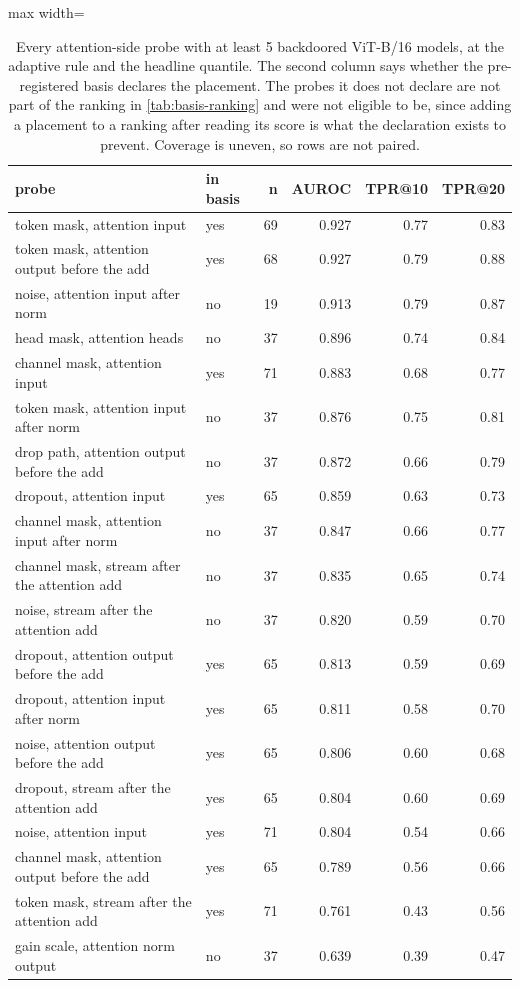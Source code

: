 \begin{table}[htbp]
\centering
\small
\caption{Every attention-side probe with at least 5 backdoored ViT-B/16 models, at the adaptive rule and the headline quantile. The second column says whether the pre-registered basis declares the placement. The probes it does not declare are not part of the ranking in \cref{tab:basis-ranking} and were not eligible to be, since adding a placement to a ranking after reading its score is what the declaration exists to prevent. Coverage is uneven, so rows are not paired.}
\label{tab:attention-probes}
\begin{adjustbox}{max width=\linewidth}
\begin{tabular}{llrrrr}
\toprule
probe & in basis & n & AUROC & TPR@10 & TPR@20 \\
\midrule
token mask, attention input & yes & 69 & 0.927 & 0.77 & 0.83 \\
token mask, attention output before the add & yes & 68 & 0.927 & 0.79 & 0.88 \\
noise, attention input after norm & no & 19 & 0.913 & 0.79 & 0.87 \\
head mask, attention heads & no & 37 & 0.896 & 0.74 & 0.84 \\
channel mask, attention input & yes & 71 & 0.883 & 0.68 & 0.77 \\
token mask, attention input after norm & no & 37 & 0.876 & 0.75 & 0.81 \\
drop path, attention output before the add & no & 37 & 0.872 & 0.66 & 0.79 \\
dropout, attention input & yes & 65 & 0.859 & 0.63 & 0.73 \\
channel mask, attention input after norm & no & 37 & 0.847 & 0.66 & 0.77 \\
channel mask, stream after the attention add & no & 37 & 0.835 & 0.65 & 0.74 \\
noise, stream after the attention add & no & 37 & 0.820 & 0.59 & 0.70 \\
dropout, attention output before the add & yes & 65 & 0.813 & 0.59 & 0.69 \\
dropout, attention input after norm & yes & 65 & 0.811 & 0.58 & 0.70 \\
noise, attention output before the add & yes & 65 & 0.806 & 0.60 & 0.68 \\
dropout, stream after the attention add & yes & 65 & 0.804 & 0.60 & 0.69 \\
noise, attention input & yes & 71 & 0.804 & 0.54 & 0.66 \\
channel mask, attention output before the add & yes & 65 & 0.789 & 0.56 & 0.66 \\
token mask, stream after the attention add & yes & 71 & 0.761 & 0.43 & 0.56 \\
gain scale, attention norm output & no & 37 & 0.639 & 0.39 & 0.47 \\
\bottomrule
\end{tabular}
\end{adjustbox}
\end{table}

